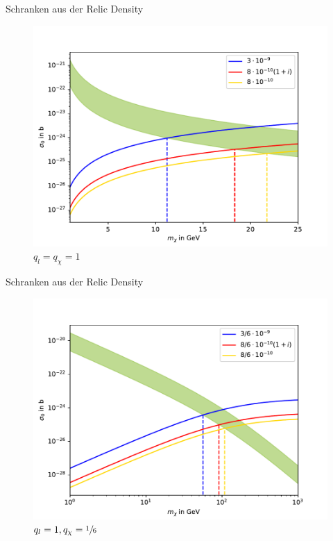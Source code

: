 \begin{frame}{Schranken aus der Relic Density}
\begin{figure}
	\centering
	\includegraphics[width=.8\textwidth]{Bilder/Relic11.pdf}
	\caption{$q_l=q_\chi=1$}
\end{figure}
\end{frame}
\begin{frame}[noframenumbering]{Schranken aus der Relic Density}
\begin{figure}
\centering
\includegraphics[width=.8\textwidth]{Bilder/Relic116.pdf}
\caption{$q_l=1,q_\chi=\sfrac{1}{6}$}
\end{figure}
\end{frame}